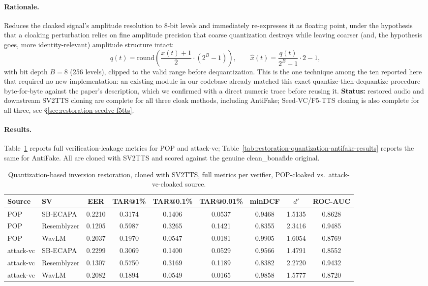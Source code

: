 \documentclass[11pt]{article}
\begin{document}
\paragraph{Rationale.} Reduces the cloaked signal's amplitude
resolution to 8-bit levels and immediately re-expresses it as floating
point, under the hypothesis that a cloaking perturbation relies on fine
amplitude precision that coarse quantization destroys while leaving
coarser (and, the hypothesis goes, more identity-relevant) amplitude
structure intact:
\[
q(t) = \mathrm{round}\!\left(\frac{x(t)+1}{2}\cdot(2^{B}-1)\right), \qquad
\hat{x}(t) = \frac{q(t)}{2^{B}-1}\cdot 2 - 1,
\]
with bit depth $B=8$ (256 levels), clipped to the valid range before
dequantization. This is the one technique among the ten reported here
that required no new implementation: an existing module in our
codebase already matched this exact quantize-then-dequantize procedure
byte-for-byte against the paper's description, which we confirmed with
a direct numeric trace before reusing it. \textbf{Status:} restored
audio and downstream SV2TTS cloning are complete for all three cloak
methods, including AntiFake; Seed-VC/F5-TTS cloning is also complete
for all three, see \S\ref{sec:restoration-seedvc-f5tts}.

\paragraph{Results.} Table~\ref{tab:restoration-quantization-results}
reports full verification-leakage metrics for POP and attack-vc;
Table~\ref{tab:restoration-quantization-antifake-results} reports the
same for AntiFake. All are cloned with SV2TTS and scored against the
genuine clean\_bonafide original.

\begin{table}[H]
\centering
\caption{Quantization-based inversion restoration, cloned with SV2TTS,
full metrics per verifier, POP-cloaked vs.\ attack-vc-cloaked source.}
\label{tab:restoration-quantization-results}
\begin{tabular}{llccccccc}
\toprule
Source & SV & EER & TAR@1\% & TAR@0.1\% & TAR@0.01\% & minDCF & $d'$ & ROC-AUC \\
\midrule
POP        & SB-ECAPA    & 0.2210 & 0.3174 & 0.1406 & 0.0537 & 0.9468 & 1.5135 & 0.8628 \\
POP        & Resemblyzer & 0.1205 & 0.5987 & 0.3265 & 0.1421 & 0.8355 & 2.3416 & 0.9485 \\
POP        & WavLM       & 0.2037 & 0.1970 & 0.0547 & 0.0181 & 0.9905 & 1.6054 & 0.8769 \\
\addlinespace
attack-vc  & SB-ECAPA    & 0.2299 & 0.3069 & 0.1400 & 0.0529 & 0.9566 & 1.4791 & 0.8552 \\
attack-vc  & Resemblyzer & 0.1307 & 0.5750 & 0.3169 & 0.1189 & 0.8382 & 2.2720 & 0.9432 \\
attack-vc  & WavLM       & 0.2082 & 0.1894 & 0.0549 & 0.0165 & 0.9858 & 1.5777 & 0.8720 \\
\bottomrule
\end{tabular}
\end{table}
\end{document}
